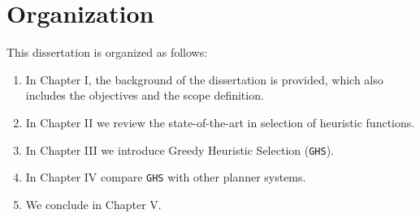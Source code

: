\section{Organization}
\noindent
This dissertation is organized as follows: 
\begin{enumerate}
\item In Chapter I, the background of the dissertation is provided, which also includes the objectives and the scope definition.
\item In Chapter II we review the state-of-the-art in selection of heuristic functions.
\item In Chapter III we introduce Greedy Heuristic Selection (\texttt{GHS}). 
\item In Chapter IV compare \texttt{GHS} with other planner systems.
\item We conclude in Chapter V.
\end{enumerate}

